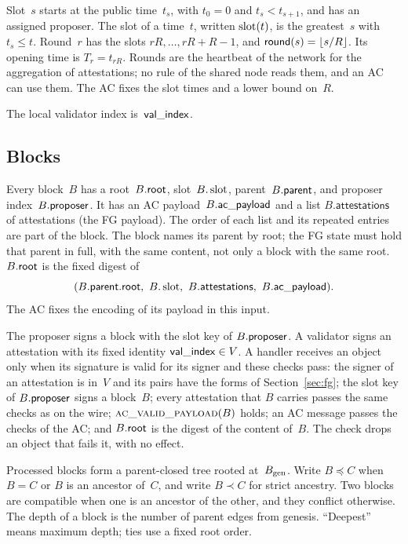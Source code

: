 Slot~$s$ starts at the public time~$t_s$, with $t_0=0$ and
$t_s<t_{s+1}$, and has an assigned proposer.  The slot of a time~$t$, written $\operatorname{slot}(t)$, is
the greatest~$s$ with $t_s\leq t$.  Round~$r$ has the slots
$rR,\ldots,rR+R-1$, and $\mathsf{round}(s)=\lfloor s/R\rfloor$.  Its opening time
is $T_r=t_{rR}$.  Rounds are the heartbeat of the network for the
aggregation of attestations; no rule of the shared node reads them, and an
AC can use them.  The AC fixes the slot times and a lower bound on~$R$.

The local validator index is~$\mathsf{val\_index}$.

\subsection{Blocks}\label{sec:blocks}

Every block~$B$ has a root~$B.\mathsf{root}$, slot~$B.\operatorname{slot}$, parent~$B.\mathsf{parent}$,
and proposer index~$B.\mathsf{proposer}$.  It has an AC payload~$B.\mathsf{ac\_payload}$ and a list
$B.\mathsf{attestations}$ of attestations (the FG payload).  The
order of each list and its repeated entries are part of the block.  The
block names its parent by root; the FG state must hold that parent in full,
with the same content, not only a block with the same root.  $B.\mathsf{root}$
is the fixed digest of
\[
 (B.\parent.\rootf,\ B.\slot,\ B.\mathsf{attestations},\ B.\acp).
\]
The AC fixes the encoding of its payload in this input.

The proposer signs a block with the slot key of $B.\mathsf{proposer}$.  A
validator signs an attestation with its fixed identity $\mathsf{val\_index}\in V$.
A handler receives an object only when its signature is valid for its
signer and these checks pass: the signer of an attestation is in~$V$ and
its pairs have the forms of Section~\ref{sec:fg}; the slot key of
$B.\mathsf{proposer}$ signs a block~$B$; every attestation
that $B$ carries passes the same checks as on the wire;
$\Call{ac\_valid\_payload}{B}$ holds; an AC message passes the checks of
the AC; and $B.\mathsf{root}$ is the digest of the content of~$B$.  The check
drops an object that fails it, with no effect.

Processed blocks form a parent-closed tree rooted at~$B_{\mathrm{gen}}$.  Write
$B\preceq C$ when $B=C$ or $B$ is an ancestor of~$C$, and write $B\prec C$
for strict ancestry.  Two blocks are compatible when one is an ancestor of
the other, and they conflict otherwise.  The depth of a block is the
number of parent edges from genesis.  ``Deepest'' means maximum depth;
ties use a fixed root order.

